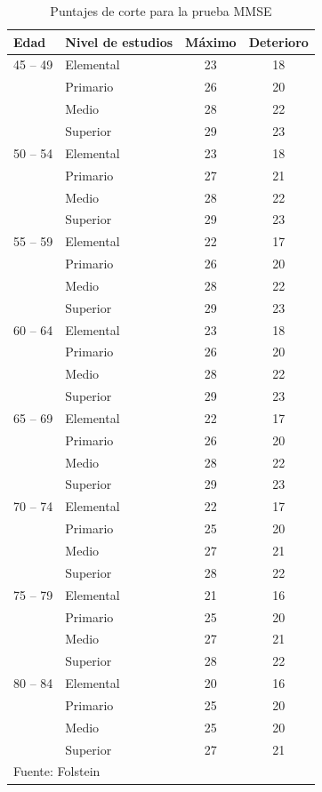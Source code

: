 \documentclass[12pt,letterpaper]{book}
\begin{document}
\begin{table}
\centering
\caption{Puntajes de corte para la prueba MMSE}
\begin{tabular}{llcc}
\toprule
Edad & Nivel de estudios & Máximo & Deterioro \\
\midrule
45 -- 49&Elemental&23&18 \\
&Primario&26&20 \\
&Medio&28&22 \\
&Superior&29&23 \\
\midrule
50 -- 54&Elemental&23&18 \\
&Primario&27&21 \\
&Medio&28&22 \\
&Superior&29&23 \\
\midrule
55 -- 59&Elemental&22&17 \\
&Primario&26&20 \\
&Medio&28&22 \\
&Superior&29&23 \\
\midrule
60 -- 64&Elemental&23&18 \\
&Primario&26&20 \\
&Medio&28&22 \\
&Superior&29&23 \\
\midrule
65 -- 69&Elemental&22&17 \\
&Primario&26&20 \\
&Medio&28&22 \\
&Superior&29&23 \\
\midrule
70 -- 74&Elemental&22&17 \\
&Primario&25&20 \\
&Medio&27&21 \\
&Superior&28&22 \\
\midrule
75 -- 79&Elemental&21&16 \\
&Primario&25&20 \\
&Medio&27&21 \\
&Superior&28&22 \\
\midrule
80 -- 84&Elemental&20&16 \\
&Primario&25&20 \\
&Medio&25&20 \\
&Superior&27&21 \\
\bottomrule
\multicolumn{2}{l}{Fuente: Folstein \cite{crum93}}
\end{tabular}
\label{anexo:mmse}
\end{table}
\end{document}
